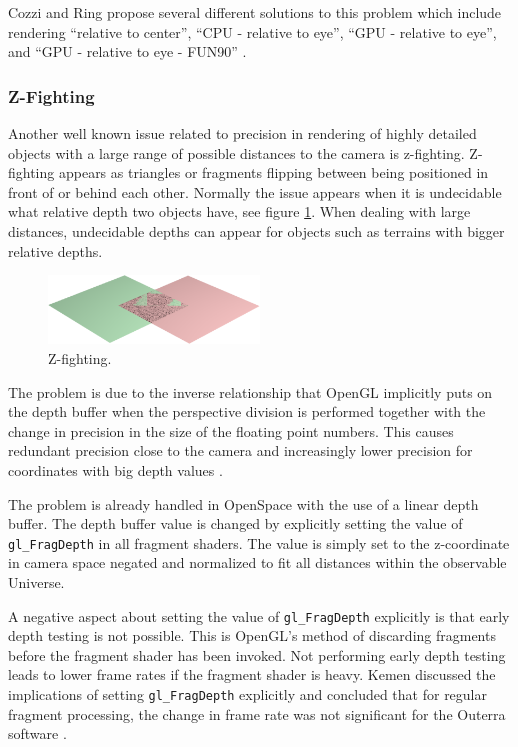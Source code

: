 Cozzi and Ring propose several different solutions to this problem which include rendering ``relative to center'', ``CPU - relative to eye'', ``GPU - relative to eye'', and ``GPU - relative to eye - FUN90'' \cite{cozzi11}. 

\subsubsection{Z-Fighting}

Another well known issue related to precision in rendering of highly detailed objects with a large range of possible distances to the camera is z-fighting. Z-fighting appears as triangles or fragments flipping between being positioned in front of or behind each other. Normally the issue appears when it is undecidable what relative depth two objects have, see figure \ref{fig:zfighting}. When dealing with large distances, undecidable depths can appear for objects such as terrains with bigger relative depths.

\begin{figure}[htbp]
    \centering
    \includegraphics[width=0.5\textwidth]{figures/zfighting.png}
    \caption{Z-fighting.}
    \label{fig:zfighting}
\end{figure}

The problem is due to the inverse relationship that OpenGL implicitly puts on the depth buffer when the perspective division is performed together with the change in precision in the size of the floating point numbers. This causes redundant precision close to the camera and increasingly lower precision for coordinates with big depth values \cite{cozzi11}.

The problem is already handled in OpenSpace with the use of a linear depth buffer. The depth buffer value is changed by explicitly setting the value of \texttt{gl\_FragDepth} in all fragment shaders. The value is simply set to the z-coordinate in camera space negated and normalized to fit all distances within the observable Universe.

A negative aspect about setting the value of \texttt{gl\_FragDepth} explicitly is that early depth testing is not possible. This is OpenGL's method of discarding fragments before the fragment shader has been invoked. Not performing early depth testing leads to lower frame rates if the fragment shader is heavy. Kemen discussed the implications of setting \texttt{gl\_FragDepth} explicitly and concluded that for regular fragment processing, the change in frame rate was not significant for the Outerra software \cite{kemen12}.

